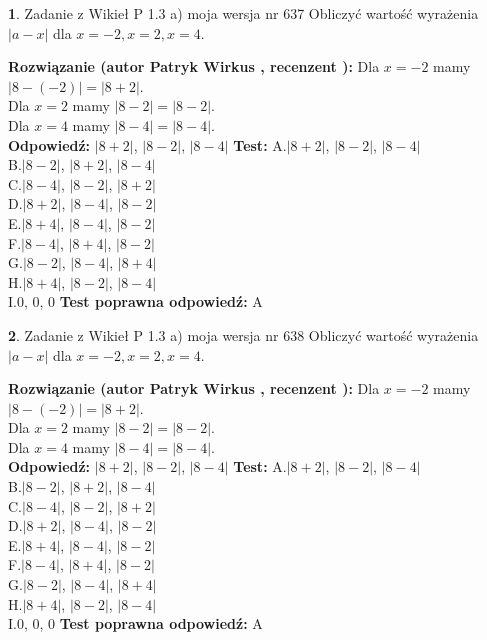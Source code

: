 \documentclass[12pt, a4paper]{article}
\theoremstyle{definition} %
\newtheorem{zad}{}
\newcommand{\zadStart}[1]{\begin{zad}#1\newline}
\newcommand{\zadStop}{\end{zad}}
\newcommand{\rozwStart}[2]{\noindent \textbf{Rozwiązanie (autor #1 , recenzent #2): }\newline}
\newcommand{\rozwStop}{\newline}
\newcommand{\odpStart}{\noindent \textbf{Odpowiedź:}\newline}
\newcommand{\odpStop}{\newline}
\newcommand{\testStart}{\noindent \textbf{Test:}\newline}
\newcommand{\testStop}{\newline}
\newcommand{\kluczStart}{\noindent \textbf{Test poprawna odpowiedź:}\newline}
\newcommand{\kluczStop}{\newline}
\begin{document}
\zadStart{Zadanie z Wikieł P 1.3 a) moja wersja nr 637}
Obliczyć wartość wyrażenia $|a - x|$ dla $x=-2,x=2,x=4$.
\zadStop
\rozwStart{Patryk Wirkus}{}
Dla $x = -2$ mamy $|8 - (-2)| = |8 + 2|$.\\
Dla $x = 2$ mamy $|8 - 2| = |8 - 2|$.\\
Dla $x = 4$ mamy $|8 - 4| = |8 - 4|$.\\
\rozwStop
\odpStart
$|8 + 2|$, $|8 - 2|$, $|8 - 4|$
\odpStop
\testStart
A.$|8 + 2|$, $|8 - 2|$, $|8 - 4|$\\
B.$|8 - 2|$, $|8 + 2|$, $|8 - 4|$\\
C.$|8 - 4|$, $|8 - 2|$, $|8 + 2|$\\
D.$|8 + 2|$, $|8 - 4|$, $|8 - 2|$\\
E.$|8 + 4|$, $|8 - 4|$, $|8 - 2|$\\
F.$|8 - 4|$, $|8 + 4|$, $|8 - 2|$\\
G.$|8 - 2|$, $|8 - 4|$, $|8 + 4|$\\
H.$|8 + 4|$, $|8 - 2|$, $|8 - 4|$\\
I.$0$, $0$, $0$
\testStop
\kluczStart
A
\kluczStop



\zadStart{Zadanie z Wikieł P 1.3 a) moja wersja nr 638}
Obliczyć wartość wyrażenia $|a - x|$ dla $x=-2,x=2,x=4$.
\zadStop
\rozwStart{Patryk Wirkus}{}
Dla $x = -2$ mamy $|8 - (-2)| = |8 + 2|$.\\
Dla $x = 2$ mamy $|8 - 2| = |8 - 2|$.\\
Dla $x = 4$ mamy $|8 - 4| = |8 - 4|$.\\
\rozwStop
\odpStart
$|8 + 2|$, $|8 - 2|$, $|8 - 4|$
\odpStop
\testStart
A.$|8 + 2|$, $|8 - 2|$, $|8 - 4|$\\
B.$|8 - 2|$, $|8 + 2|$, $|8 - 4|$\\
C.$|8 - 4|$, $|8 - 2|$, $|8 + 2|$\\
D.$|8 + 2|$, $|8 - 4|$, $|8 - 2|$\\
E.$|8 + 4|$, $|8 - 4|$, $|8 - 2|$\\
F.$|8 - 4|$, $|8 + 4|$, $|8 - 2|$\\
G.$|8 - 2|$, $|8 - 4|$, $|8 + 4|$\\
H.$|8 + 4|$, $|8 - 2|$, $|8 - 4|$\\
I.$0$, $0$, $0$
\testStop
\kluczStart
A
\kluczStop
\end{document}
